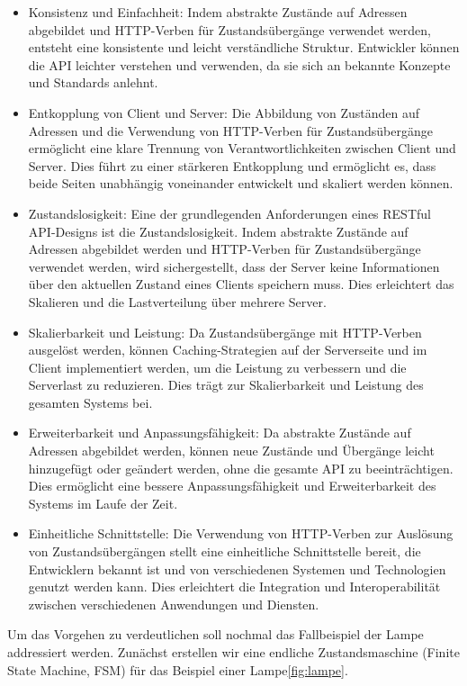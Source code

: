 \begin{itemize}
\item Konsistenz und Einfachheit: Indem abstrakte Zustände auf Adressen abgebildet und HTTP-Verben für Zustandsübergänge verwendet werden, entsteht eine konsistente und leicht verständliche Struktur. Entwickler können die API leichter verstehen und verwenden, da sie sich an bekannte Konzepte und Standards anlehnt.
\item Entkopplung von Client und Server: Die Abbildung von Zuständen auf Adressen und die Verwendung von HTTP-Verben für Zustandsübergänge ermöglicht eine klare Trennung von Verantwortlichkeiten zwischen Client und Server. Dies führt zu einer stärkeren Entkopplung und ermöglicht es, dass beide Seiten unabhängig voneinander entwickelt und skaliert werden können.
\item Zustandslosigkeit: Eine der grundlegenden Anforderungen eines RESTful API-Designs ist die Zustandslosigkeit. Indem abstrakte Zustände auf Adressen abgebildet werden und HTTP-Verben für Zustandsübergänge verwendet werden, wird sichergestellt, dass der Server keine Informationen über den aktuellen Zustand eines Clients speichern muss. Dies erleichtert das Skalieren und die Lastverteilung über mehrere Server.
\item Skalierbarkeit und Leistung: Da Zustandsübergänge mit HTTP-Verben ausgelöst werden, können Caching-Strategien auf der Serverseite und im Client implementiert werden, um die Leistung zu verbessern und die Serverlast zu reduzieren. Dies trägt zur Skalierbarkeit und Leistung des gesamten Systems bei.
\item Erweiterbarkeit und Anpassungsfähigkeit: Da abstrakte Zustände auf Adressen abgebildet werden, können neue Zustände und Übergänge leicht hinzugefügt oder geändert werden, ohne die gesamte API zu beeinträchtigen. Dies ermöglicht eine bessere Anpassungsfähigkeit und Erweiterbarkeit des Systems im Laufe der Zeit.
\item Einheitliche Schnittstelle: Die Verwendung von HTTP-Verben zur Auslösung von Zustandsübergängen stellt eine einheitliche Schnittstelle bereit, die Entwicklern bekannt ist und von verschiedenen Systemen und Technologien genutzt werden kann. Dies erleichtert die Integration und Interoperabilität zwischen verschiedenen Anwendungen und Diensten.
\end{itemize}

Um das Vorgehen zu verdeutlichen soll nochmal das Fallbeispiel der Lampe addressiert werden. Zunächst erstellen wir eine endliche Zustandsmaschine (Finite State Machine, FSM) für das Beispiel einer Lampe\ref{fig:lampe}.

